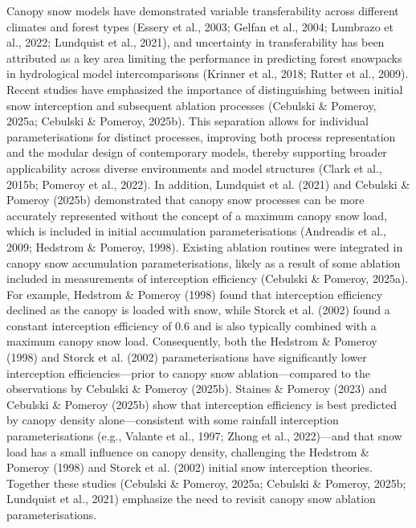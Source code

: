 \documentclass[
  letterpaper,
]{tex/uofsthesis-cs}
\begin{document}
Canopy snow models have demonstrated variable transferability across
different climates and forest types (Essery et al., 2003; Gelfan et al.,
2004; Lumbrazo et al., 2022; Lundquist et al., 2021), and uncertainty in
transferability has been attributed as a key area limiting the
performance in predicting forest snowpacks in hydrological model
intercomparisons (Krinner et al., 2018; Rutter et al., 2009). Recent
studies have emphasized the importance of distinguishing between initial
snow interception and subsequent ablation processes (Cebulski \&
Pomeroy, 2025a; Cebulski \& Pomeroy, 2025b). This separation allows for
individual parameterisations for distinct processes, improving both
process representation and the modular design of contemporary models,
thereby supporting broader applicability across diverse environments and
model structures (Clark et al., 2015b; Pomeroy et al., 2022). In
addition, Lundquist et al. (2021) and Cebulski \& Pomeroy (2025b)
demonstrated that canopy snow processes can be more accurately
represented without the concept of a maximum canopy snow load, which is
included in initial accumulation parameterisations (Andreadis et al.,
2009; Hedstrom \& Pomeroy, 1998). Existing ablation routines were
integrated in canopy snow accumulation parameterisations, likely as a
result of some ablation included in measurements of interception
efficiency (Cebulski \& Pomeroy, 2025a). For example, Hedstrom \&
Pomeroy (1998) found that interception efficiency declined as the canopy
is loaded with snow, while Storck et al. (2002) found a constant
interception efficiency of 0.6 and is also typically combined with a
maximum canopy snow load. Consequently, both the Hedstrom \& Pomeroy
(1998) and Storck et al. (2002) parameterisations have significantly
lower interception efficiencies---prior to canopy snow
ablation---compared to the observations by Cebulski \& Pomeroy (2025b).
Staines \& Pomeroy (2023) and Cebulski \& Pomeroy (2025b) show that
interception efficiency is best predicted by canopy density
alone---consistent with some rainfall interception parameterisations
(e.g., Valante et al., 1997; Zhong et al., 2022)---and that snow load
has a small influence on canopy density, challenging the Hedstrom \&
Pomeroy (1998) and Storck et al. (2002) initial snow interception
theories. Together these studies (Cebulski \& Pomeroy, 2025a; Cebulski
\& Pomeroy, 2025b; Lundquist et al., 2021) emphasize the need to revisit
canopy snow ablation parameterisations.
\end{document}
